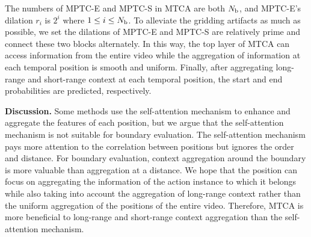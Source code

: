 \documentclass[letterpaper]{article} \usepackage{aaai22}  \usepackage{times}  \usepackage{helvet}  \usepackage{courier}  \usepackage[hyphens]{url}  \usepackage{graphicx} \urlstyle{rm} \def\UrlFont{\rm}  \usepackage{natbib}  \usepackage{caption} \DeclareCaptionStyle{ruled}{labelfont=normalfont,labelsep=colon,strut=off} \frenchspacing  \setlength{\pdfpagewidth}{8.5in}  \setlength{\pdfpageheight}{11in}  \usepackage{algorithm}
\begin{document}
The numbers of MPTC-E and MPTC-S in MTCA are both $N_{\rm b}$, and MPTC-E's dilation $r_i$ is $2^{i}$ where $1\leq i \leq N_{\rm b}$.
To alleviate the gridding artifacts as much as possible, we set the dilations of MPTC-E and MPTC-S are relatively prime and connect these two blocks alternately.
In this way, the top layer of MTCA can access information from the entire video while the aggregation of information at each temporal position is smooth and uniform.
Finally, after aggregating long-range and short-range context at each temporal position, the start and end probabilities are predicted, respectively.











\noindent \textbf{Discussion.}
Some methods use the self-attention mechanism to enhance and aggregate the features of each position, but we argue that the self-attention mechanism is not suitable for boundary evaluation.
The self-attention mechanism pays more attention to the correlation between positions but ignores the order and distance.
For boundary evaluation, context aggregation around the boundary is more valuable than aggregation at a distance.
We hope that the position can focus on aggregating the information of the action instance to which it belongs while also taking into account the aggregation of long-range context rather than the uniform aggregation of the positions of the entire video.
Therefore, MTCA is more beneficial to long-range and short-range context aggregation than the self-attention mechanism.
\end{document}
